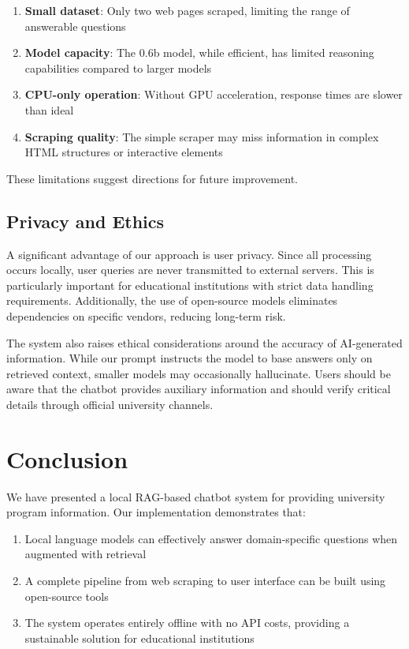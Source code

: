 \documentclass[conference]{IEEEtran}
\begin{document}
\begin{enumerate}
    \item \textbf{Small dataset}: Only two web pages scraped, limiting the range of answerable questions
    \item \textbf{Model capacity}: The 0.6b model, while efficient, has limited reasoning capabilities compared to larger models
    \item \textbf{CPU-only operation}: Without GPU acceleration, response times are slower than ideal
    \item \textbf{Scraping quality}: The simple scraper may miss information in complex HTML structures or interactive elements
\end{enumerate}

These limitations suggest directions for future improvement.

\subsection{Privacy and Ethics}
A significant advantage of our approach is user privacy. Since all processing occurs locally, user queries are never transmitted to external servers. This is particularly important for educational institutions with strict data handling requirements. Additionally, the use of open-source models eliminates dependencies on specific vendors, reducing long-term risk.

The system also raises ethical considerations around the accuracy of AI-generated information. While our prompt instructs the model to base answers only on retrieved context, smaller models may occasionally hallucinate. Users should be aware that the chatbot provides auxiliary information and should verify critical details through official university channels.

\section{Conclusion}
\label{sec:conclusion}

We have presented a local RAG-based chatbot system for providing university program information. Our implementation demonstrates that:

\begin{enumerate}
    \item Local language models can effectively answer domain-specific questions when augmented with retrieval
    \item A complete pipeline from web scraping to user interface can be built using open-source tools
    \item The system operates entirely offline with no API costs, providing a sustainable solution for educational institutions
\end{enumerate}
\end{document}
